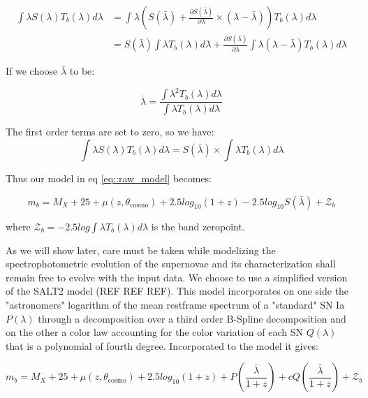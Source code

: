 \documentclass[\docopts]{\docclass}
\begin{document}
\begin{equation}
\begin{split}
\int \lambda S(\lambda) T_b(\lambda) d\lambda &= \int \lambda \left(S(\bar\lambda)+\frac{\partial S(\bar\lambda)}{\partial \lambda} \times ( \lambda - \bar\lambda ) \right) T_b(\lambda) d\lambda \\
&= S(\bar\lambda) \int \lambda T_b(\lambda) d\lambda + \frac{\partial S(\bar \lambda)}{\partial\lambda} \int \lambda (\lambda - \bar\lambda) T_b(\lambda) d\lambda
\end{split}
\end{equation}

If we choose $\bar \lambda$ to be:

\begin{equation}
  \bar \lambda = \frac{\int \lambda^2 T_b(\lambda) d\lambda}{\int \lambda T_b(\lambda) d\lambda}
\end{equation}

The first order terms are set to zero, so we have:
\begin{equation}
\int \lambda S(\lambda) T_b(\lambda) d\lambda = S(\bar\lambda) \times \int \lambda T_b(\lambda) d\lambda
\end{equation}

Thus our model in eq \ref{eq::raw_model} becomes:
          
\begin{equation}
  m_b = M_X + 25 + \mu(z, \theta_\text{cosmo}) + 2.5log_{10}(1+z) - 2.5 log_{10} S(\bar \lambda) + \mathcal{Z}_b
\end{equation}

where $\mathcal{Z}_b = -2.5 log \int \lambda T_b(\lambda) d\lambda$ is the band zeropoint.

As we will show later, care must be taken while modelizing the spectrophotometric evolution of the supernovae and its characterization shall remain free to evolve with the input data.
We choose to use a simplified version of the SALT2 model (REF REF REF).
This model incorporates on one side the "astronomers" logarithm of the mean restframe spectrum of a "standard" SN Ia $P(\lambda)$ through a decomposition over a third order B-Spline decomposition and on the other a color law accounting for the color variation of each SN $Q(\lambda)$ that is a polynomial of fourth degree.
Incorporated to the model it gives:

\begin{equation}
m_b = M_X + 25 + \mu(z, \theta_\text{cosmo}) + 2.5log_{10}(1+z) + P(\frac{\bar \lambda}{1+z}) + cQ(\frac{\bar \lambda}{1+z})+ \mathcal{Z}_b
\end{equation}
\end{document}
